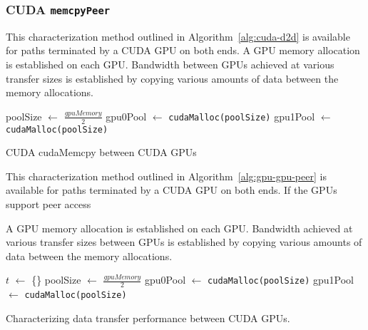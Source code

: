 \subsubsection{CUDA \texttt{memcpyPeer}}

This characterization method outlined in Algorithm~\ref{alg:cuda-d2d} is available for paths terminated by a CUDA GPU on both ends.
A GPU memory allocation is established on each GPU.
Bandwidth between GPUs achieved at various transfer sizes is established by copying various amounts of data between the memory allocations.

\begin{algorithm}[ht]
    \SetAlgoLined
    poolSize $\gets$ $\frac{gpuMemory}{2}$\;
    gpu0Pool $\gets$ \texttt{cudaMalloc(poolSize)}\;
    gpu1Pool $\gets$ \texttt{cudaMalloc(poolSize)}\;
    \caption{CUDA cudaMemcpy between CUDA GPUs}
    \label{alg:cuda-p2p}
\end{algorithm}


This characterization method outlined in Algorithm~\ref{alg:gpu-gpu-peer} is available for paths terminated by a CUDA GPU on both ends.
If the GPUs support peer access

A GPU memory allocation is established on each GPU.
Bandwidth achieved at various transfer sizes between GPUs is established by copying various amounts of data between the memory allocations.


\begin{algorithm}[ht]
    \SetAlgoLined
    $t$ $\gets$ \{\}\;
    poolSize $\gets$ $\frac{gpuMemory}{2}$\;
    gpu0Pool $\gets$ \texttt{cudaMalloc(poolSize)}\;
    gpu1Pool $\gets$ \texttt{cudaMalloc(poolSize)}\;
    \caption{Characterizing data transfer performance between CUDA GPUs.}
    \label{alg:gpu-gpu-peer}
\end{algorithm}